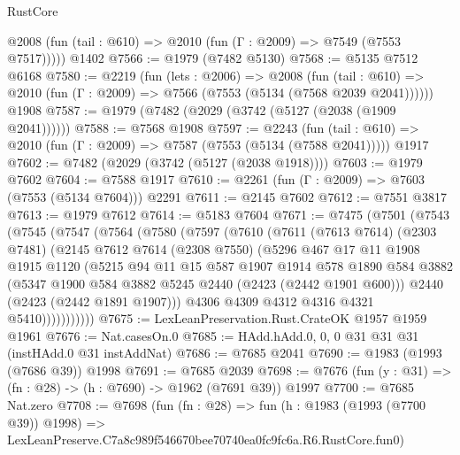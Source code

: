 \begin{lexlean}{RustCore}
\begin{coremodule}
      @2008 (fun (tail : @610) => @2010 (fun (Γ : @2009) => @7549 (@7553 @7517)))))
    @1402
@7566 := @1979 (@7482 @5130)
@7568 := @5135 @7512 @6168
@7580 := @2219
    (fun (lets : @2006) =>
    @2008
      (fun (tail : @610) => @2010 (fun (Γ : @2009) => @7566 (@7553 (@5134 (@7568 @2039 @2041))))))
    @1908
@7587 := @1979 (@7482 (@2029 (@3742 (@5127 (@2038 (@1909 @2041))))))
@7588 := @7568 @1908
@7597 := @2243
    (fun (tail : @610) => @2010 (fun (Γ : @2009) => @7587 (@7553 (@5134 (@7588 @2041)))))
    @1917
@7602 := @7482 (@2029 (@3742 (@5127 (@2038 @1918))))
@7603 := @1979 @7602
@7604 := @7588 @1917
@7610 := @2261 (fun (Γ : @2009) => @7603 (@7553 (@5134 @7604))) @2291
@7611 := @2145 @7602
@7612 := @7551 @3817
@7613 := @1979 @7612
@7614 := @5183 @7604
@7671 := @7475
    (@7501
      (@7543
        (@7545
          (@7547
            (@7564
              (@7580
                (@7597
                  (@7610
                    (@7611
                      (@7613 @7614)
                      (@2303 @7481)
                      (@2145
                        @7612
                        @7614
                        (@2308 @7550)
                        (@5296
                          @467
                          @17
                          @11
                          @1908
                          @1915
                          @1120
                          (@5215
                            @94
                            @11
                            @15
                            @587
                            @1907
                            @1914
                            @578
                            @1890
                            @584
                            @3882
                            (@5347 @1900 @584 @3882 @5245 @2440 (@2423 (@2442 @1901 @600)))
                            @2440
                            (@2423 (@2442 @1891 @1907)))
                          @4306
                          @4309
                          @4312
                          @4316
                          @4321
                          @5410)))))))))))
@7675 := LexLeanPreservation.Rust.CrateOK @1957 @1959 @1961
@7676 := Nat.casesOn.{0}
@7685 := HAdd.hAdd.{0, 0, 0} @31 @31 @31 (instHAdd.{0} @31 instAddNat)
@7686 := @7685 @2041
@7690 := @1983 (@1993 (@7686 @39)) @1998
@7691 := @7685 @2039
@7698 := @7676 (fun (y : @31) => (fn : @28) -> (h : @7690) -> @1962 (@7691 @39)) @1997
@7700 := @7685 Nat.zero
@7708 := @7698
    (fun (fn : @28) =>
    fun (h : @1983 (@1993 (@7700 @39)) @1998) =>
    LexLeanPreserve.C7a8c989f546670bee70740ea0fc9fc6a.R6.RustCore.fun0)

\end{coremodule}
\end{lexlean}
